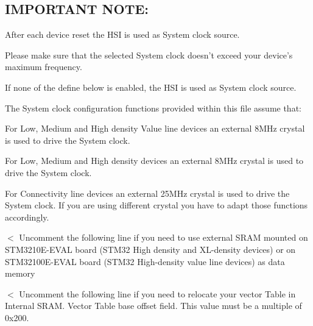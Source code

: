 \subsection*{I\-M\-P\-O\-R\-T\-A\-N\-T N\-O\-T\-E\-: }


\begin{DoxyEnumerate}
\item After each device reset the H\-S\-I is used as System clock source.
\item Please make sure that the selected System clock doesn't exceed your device's maximum frequency.
\item If none of the define below is enabled, the H\-S\-I is used as System clock source.
\item The System clock configuration functions provided within this file assume that\-:
\begin{DoxyItemize}
\item For Low, Medium and High density Value line devices an external 8\-M\-Hz crystal is used to drive the System clock.
\item For Low, Medium and High density devices an external 8\-M\-Hz crystal is used to drive the System clock.
\item For Connectivity line devices an external 25\-M\-Hz crystal is used to drive the System clock. If you are using different crystal you have to adapt those functions accordingly.
\end{DoxyItemize}
\end{DoxyEnumerate}

$<$ Uncomment the following line if you need to use external S\-R\-A\-M mounted on S\-T\-M3210\-E-\/\-E\-V\-A\-L board (S\-T\-M32 High density and X\-L-\/density devices) or on S\-T\-M32100\-E-\/\-E\-V\-A\-L board (S\-T\-M32 High-\/density value line devices) as data memory

$<$ Uncomment the following line if you need to relocate your vector Table in Internal S\-R\-A\-M. Vector Table base offset field. This value must be a multiple of 0x200. 